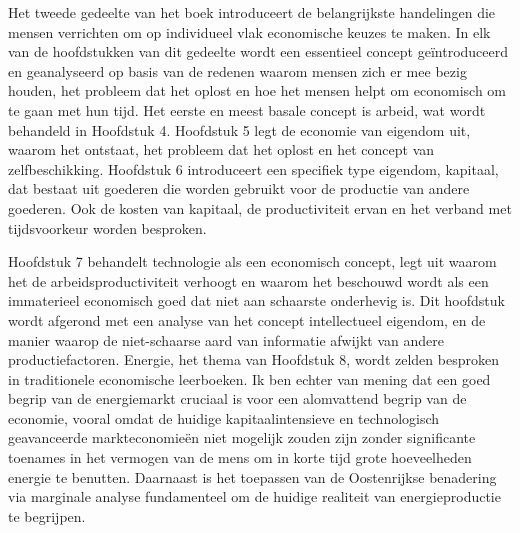 Het tweede gedeelte van het boek introduceert de belangrijkste handelingen die mensen verrichten om op individueel vlak economische keuzes te maken. In elk van de hoofdstukken van dit gedeelte wordt een essentieel concept geïntroduceerd en geanalyseerd op basis van de redenen waarom mensen zich er mee bezig houden, het probleem dat het oplost en hoe het mensen helpt om economisch om te gaan met hun tijd. Het eerste en meest basale concept is arbeid, wat wordt behandeld in Hoofdstuk 4. Hoofdstuk 5 legt de economie van eigendom uit, waarom het ontstaat, het probleem dat het oplost en het concept van zelfbeschikking. Hoofdstuk 6 introduceert een specifiek type eigendom, kapitaal, dat bestaat uit goederen die worden gebruikt voor de productie van andere goederen. Ook de kosten van kapitaal, de productiviteit ervan en het verband met tijdsvoorkeur worden besproken.

Hoofdstuk 7 behandelt technologie als een economisch concept, legt uit waarom het de arbeidsproductiviteit verhoogt en waarom het beschouwd wordt als een immaterieel economisch goed dat niet aan schaarste onderhevig is. Dit hoofdstuk wordt afgerond met een analyse van het concept intellectueel eigendom, en de manier waarop de niet-schaarse aard van informatie afwijkt van andere productiefactoren. Energie, het thema van Hoofdstuk 8, wordt zelden besproken in traditionele economische leerboeken. Ik ben echter van mening dat een goed begrip van de energiemarkt cruciaal is voor een alomvattend begrip van de economie, vooral omdat de huidige kapitaalintensieve en technologisch geavanceerde markteconomieën niet mogelijk zouden zijn zonder significante toenames in het vermogen van de mens om in korte tijd grote hoeveelheden energie te benutten. Daarnaast is het toepassen van de Oostenrijkse benadering via marginale analyse fundamenteel om de huidige realiteit van energieproductie te begrijpen.

